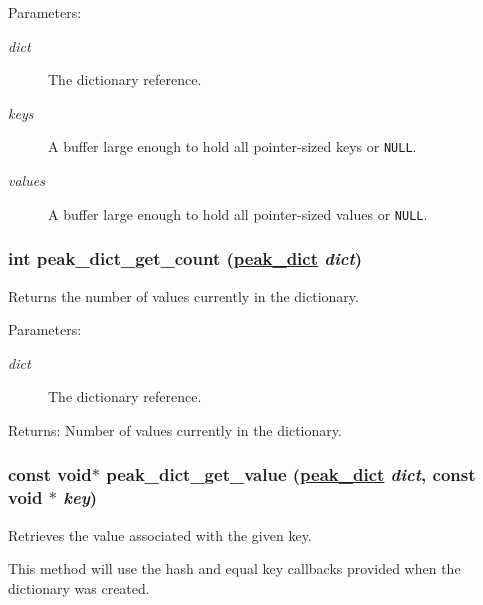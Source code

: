 \begin{Desc}
\item[Parameters:]
\begin{description}
\item[{\em dict}]The dictionary reference. \item[{\em keys}]A buffer large enough to hold all pointer-sized keys or {\tt NULL}. \item[{\em values}]A buffer large enough to hold all pointer-sized values or {\tt NULL}. \end{description}
\end{Desc}
\hypertarget{group__dict_ga23}{
\subsubsection[peak\_\-dict\_\-get\_\-count]{\setlength{\rightskip}{0pt plus 5cm}int peak\_\-dict\_\-get\_\-count (\hyperlink{group__dict_ga0}{peak\_\-dict} {\em dict})}}
\label{group__dict_ga23}


Returns the number of values currently in the dictionary. 

\begin{Desc}
\item[Parameters:]
\begin{description}
\item[{\em dict}]The dictionary reference.\end{description}
\end{Desc}
\begin{Desc}
\item[Returns:]Number of values currently in the dictionary. \end{Desc}
\hypertarget{group__dict_ga24}{
\subsubsection[peak\_\-dict\_\-get\_\-value]{\setlength{\rightskip}{0pt plus 5cm}const void$\ast$ peak\_\-dict\_\-get\_\-value (\hyperlink{group__dict_ga0}{peak\_\-dict} {\em dict}, const void $\ast$ {\em key})}}
\label{group__dict_ga24}


Retrieves the value associated with the given key. 

This method will use the hash and equal key callbacks provided when the dictionary was created.

